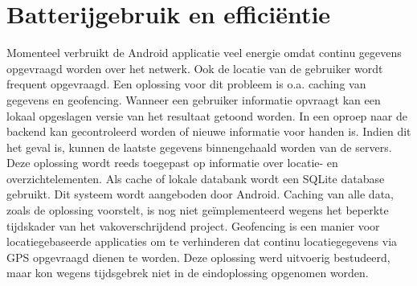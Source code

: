 \section{Batterijgebruik en efficiëntie}
Momenteel verbruikt de Android applicatie veel energie omdat continu gegevens opgevraagd worden over het netwerk. Ook de locatie van de gebruiker wordt frequent opgevraagd.
Een oplossing voor dit probleem is o.a. caching van gegevens en geofencing. Wanneer een gebruiker informatie opvraagt kan een lokaal opgeslagen versie van het resultaat getoond worden. In een oproep naar de backend kan gecontroleerd worden of nieuwe informatie voor handen is. Indien dit het geval is, kunnen de laatste gegevens binnengehaald worden van de servers. Deze oplossing wordt reeds toegepast op informatie over locatie- en overzichtelementen. Als cache of lokale databank wordt een SQLite database gebruikt. Dit systeem wordt aangeboden door Android. Caching van alle data, zoals de oplossing voorstelt, is nog niet geïmplementeerd wegens het beperkte tijdskader van het vakoverschrijdend project.
Geofencing is een manier voor locatiegebaseerde applicaties om te verhinderen dat continu locatiegegevens via GPS opgevraagd dienen te worden. Deze oplossing werd uitvoerig bestudeerd, maar kon wegens tijdsgebrek niet in de eindoplossing opgenomen worden.


